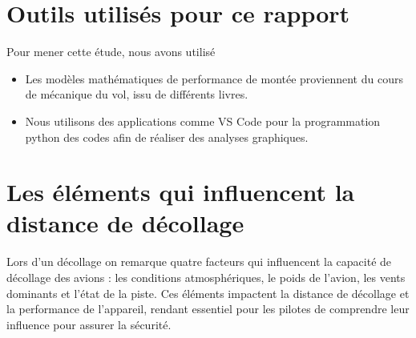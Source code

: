 \section{ Outils utilisés  pour ce rapport}

	Pour mener cette étude, nous avons utilisé
	\begin{itemize}
		\item  Les modèles mathématiques de performance de montée proviennent du cours de mécanique du vol, issu de différents livres.
		\item Nous utilisons des applications comme VS Code pour la programmation python des codes afin de réaliser des analyses graphiques.
	\end{itemize}

	

	\vspace{1cm}
	
	
	
	
	
	
	
	
	\section{ Les éléments qui influencent la distance de décollage }
	
	Lors d'un décollage on remarque quatre facteurs qui influencent la capacité de décollage des avions : les conditions atmosphériques, le poids de l'avion, les vents dominants et l'état de la piste. Ces éléments impactent la distance de décollage et la performance de l'appareil, rendant essentiel pour les pilotes de comprendre leur influence pour assurer la sécurité.
	
	
	
